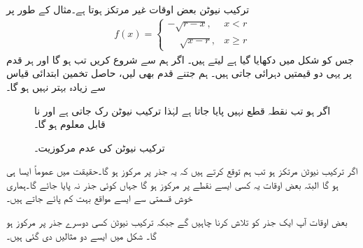 ترکیب نیوٹن بعض اوقات غیر مرتکز ہوتا ہے۔مثال کے طور پر
\begin{align*}
f(x)=
\begin{cases}
-\sqrt{r-x},&x<r\\
\phantom{-}\sqrt{x-r},&x\ge r
\end{cases}
\end{align*}
جس کو شکل   میں دکھایا گیا ہے لیتے ہیں۔ اگر ہم  سے شروع کریں تب  ہو گا اور ہر قدم پر یہی دو قیمتیں دہرائی جاتی ہیں۔ ہم جتنے قدم بھی لیں، حاصل تخمین ابتدائی قیاس سے زیادہ بہتر نہیں ہو گا۔
\begin{figure}
\centering
\begin{minipage}{0.45\textwidth}
\centering
{}
\caption{
اگر  ہو تب نقطہ قطع نہیں پایا جاتا ہے لہٰذا ترکیب نیوٹن رک جاتی ہے اور  نا قابل معلوم ہو گا۔
}
\label{شکل_استعمال_نیوٹن_رک_گیا}
\end{minipage}\hfill
\begin{minipage}{0.45\textwidth}
\centering
{}
\caption{ترکیب نیوٹن کی عدم مرکوزیت۔}
\label{شکل_استعمال-نیوٹن_عدم_مرکوزیت}
\end{minipage}
\end{figure}

اگر ترکیب نیوٹن مرتکز ہو تب ہم توقع کرتے ہیں کہ یہ جذر پر مرکوز ہو گا۔حقیقت میں عموماً ایسا ہی ہو گا البتہ بعض اوقات یہ کسی ایسے نقطے پر مرکوز ہو گا جہاں کوئی جذر نہ پایا جائے گا۔ہماری خوش قسمتی سے ایسے مواقع بہت کم پائے جاتے ہیں۔

بعض اوقات آپ ایک جذر کو تلاش کرنا چاہیں گے جبکہ ترکیب نیوٹن کسی دوسرے جذر پر مرکوز ہو گا۔ شکل  میں ایسے دو مثالیں دی گئی ہیں۔ 

